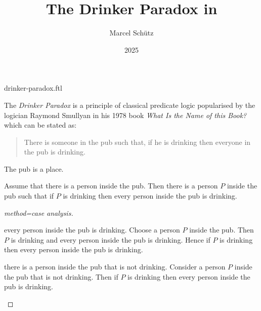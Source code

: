 \documentclass{stex}
\title{The Drinker Paradox in \Naproche}
\author{Marcel Schütz}
\date{2025}
\begin{document}
\begin{smodule}{drinker-paradox.ftl}
\maketitle



\noindent The \emph{Drinker Paradox} is a principle of classical predicate 
logic popularised by the logician Raymond Smullyan in his 1978 book
\textit{What Is the Name of this Book?} \cite{Smullyan1978} which can be 
stated as:

\begin{quotation}
  \noindent There is someone in the pub such that, if he is drinking then 
  everyone in the pub is drinking.
\end{quotation}

\begin{forthel}

  \begin{signature*}
    The pub is a place.
  \end{signature*}
  
  \begin{theorem*}[title=Drinker Paradox,name=Drinker Paradox]
    Assume that there is a person inside the pub.
    Then there is a person $P$ inside the pub such that if $P$ is drinking then every person inside the pub is drinking.
  \end{theorem*}
  \begin{proof}[method=case analysis]
    \begin{case}{every person inside the pub is drinking.}
      Choose a person $P$ inside the pub.
      Then $P$ is drinking and every person inside the pub is drinking.
      Hence if $P$ is drinking then every person inside the pub is drinking.
    \end{case}
  
    \begin{case}{there is a person inside the pub that is not drinking.}
      Consider a person $P$ inside the pub that is not drinking.
      Then if $P$ is drinking then every person inside the pub is drinking.
    \end{case}
  \end{proof}
\end{forthel}

\printbibliography
{}
\end{smodule}
\end{document}
